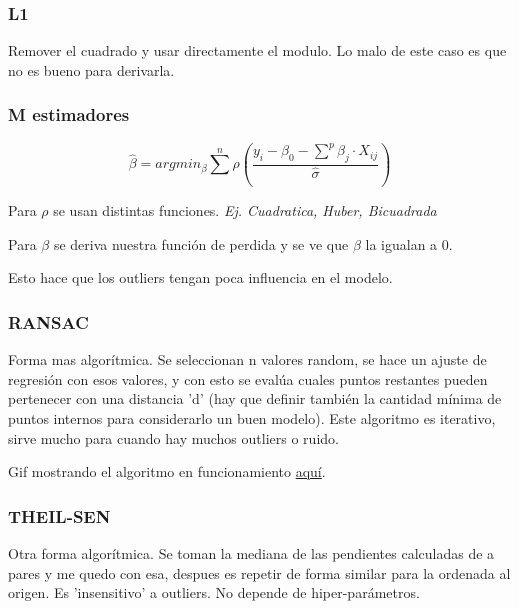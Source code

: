 \documentclass[titlepage,a4paper]{article}
\begin{document}
\subsubsection{L1}
Remover el cuadrado y usar directamente el modulo. Lo malo de este caso es que no es bueno para derivarla.

\subsubsection{M estimadores}
\begin{equation}
    \hat{\beta} = arg min_\beta \sum^{n} \rho(\frac{ y_{i}-\beta_0-\sum^{p}\beta_j \cdot X_{ij}}{\hat{\sigma}})
\end{equation}

Para $\rho$ se usan distintas funciones. \textit{Ej. Cuadratica, Huber, Bicuadrada}

Para $\beta$ se deriva nuestra función de perdida y se ve que $\beta$ la igualan a 0.

Esto hace que los outliers tengan poca influencia en el modelo.


\subsubsection{RANSAC}
Forma mas algorítmica. Se seleccionan n valores random, se hace un ajuste de regresión con esos valores, y con esto se evalúa cuales puntos restantes pueden pertenecer con una distancia 'd' (hay que definir también la cantidad mínima de puntos internos para considerarlo un buen modelo). Este algoritmo es iterativo, sirve mucho para cuando hay muchos outliers o ruido.

Gif mostrando el algoritmo en funcionamiento \href{https://upload.wikimedia.org/wikipedia/commons/c/c0/RANSAC_LINIE_Animiert.gif}{aquí}.

\subsubsection{THEIL-SEN}
Otra forma algorítmica. Se toman la mediana de las pendientes calculadas de a pares y me quedo con esa, despues es repetir de forma similar para la ordenada al origen. Es 'insensitivo' a outliers. No depende de hiper-parámetros.
\end{document}
